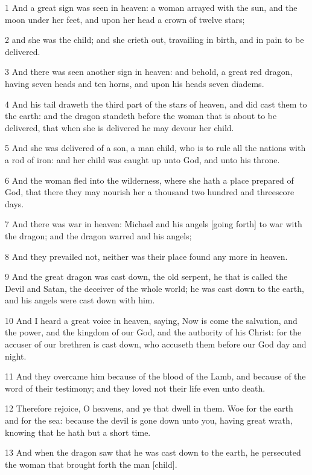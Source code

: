 \par 1 And a great sign was seen in heaven: a woman arrayed with the sun, and the moon under her feet, and upon her head a crown of twelve stars;
\par 2 and she was the child; and she crieth out, travailing in birth, and in pain to be delivered.
\par 3 And there was seen another sign in heaven: and behold, a great red dragon, having seven heads and ten horns, and upon his heads seven diadems.
\par 4 And his tail draweth the third part of the stars of heaven, and did cast them to the earth: and the dragon standeth before the woman that is about to be delivered, that when she is delivered he may devour her child.
\par 5 And she was delivered of a son, a man child, who is to rule all the nations with a rod of iron: and her child was caught up unto God, and unto his throne.
\par 6 And the woman fled into the wilderness, where she hath a place prepared of God, that there they may nourish her a thousand two hundred and threescore days.
\par 7 And there was war in heaven: Michael and his angels [going forth] to war with the dragon; and the dragon warred and his angels;
\par 8 And they prevailed not, neither was their place found any more in heaven.
\par 9 And the great dragon was cast down, the old serpent, he that is called the Devil and Satan, the deceiver of the whole world; he was cast down to the earth, and his angels were cast down with him.
\par 10 And I heard a great voice in heaven, saying, Now is come the salvation, and the power, and the kingdom of our God, and the authority of his Christ: for the accuser of our brethren is cast down, who accuseth them before our God day and night.
\par 11 And they overcame him because of the blood of the Lamb, and because of the word of their testimony; and they loved not their life even unto death.
\par 12 Therefore rejoice, O heavens, and ye that dwell in them. Woe for the earth and for the sea: because the devil is gone down unto you, having great wrath, knowing that he hath but a short time.
\par 13 And when the dragon saw that he was cast down to the earth, he persecuted the woman that brought forth the man [child].

